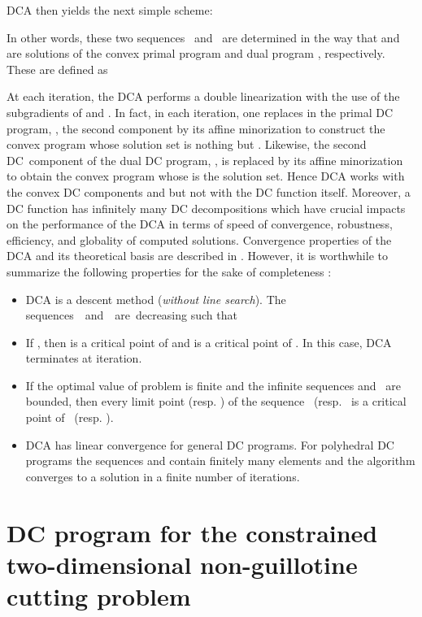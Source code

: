 \documentclass{iesmart}
\begin{document}
DCA then yields the next simple scheme:

In other words, these two sequences \ and \
are determined in the way that   and    are
solutions of the convex primal program  and dual program
, respectively. These are defined as

At each iteration, the DCA performs a double linearization with
the use of the subgradients of  and . In fact, in
each iteration, one replaces in the primal DC program, ,
the second component  by its affine minorization
 to construct
the convex program  whose solution set is nothing but
. Likewise, the second DC~component
 of the dual DC program, , is replaced by its
affine minorization    to obtain the convex program
 whose  is the solution set. Hence
DCA works with the convex DC components  and  but not with
the DC function  itself. Moreover, a DC function  has
infinitely many DC decompositions which have crucial impacts on
the performance of the DCA in terms of speed of convergence,
robustness, efficiency, and globality of computed solutions.
Convergence properties of the DCA
 and its theoretical basis are described in
\cite{lethithesis,lethi2005,PLT97,PLT98}. However, it is
worthwhile to summarize the following properties for the sake of
completeness :
\begin{itemize}
\item DCA is a descent method (\emph{without line search}).   The
sequences\ \ and\ \ are\ decreasing such that

\item If , then 
is a critical point of  and  is a critical point of
. In this case,  DCA terminates at 
iteration. \newline
\item If the optimal value  of problem  is
finite and the infinite sequences and \
are bounded, then every limit point (resp.
) of the
sequence \ (resp. \ is a critical point of \ (resp. ). \newline
\item DCA has linear convergence for general DC programs. For
polyhedral DC programs the sequences  and 
contain finitely many elements and the algorithm converges to a
solution in a finite number of iterations.

\end{itemize}

\section{DC program for the constrained
two-dimensional non-guillotine cutting problem}\label{sec:DCandDCAforNGC}
\end{document}
